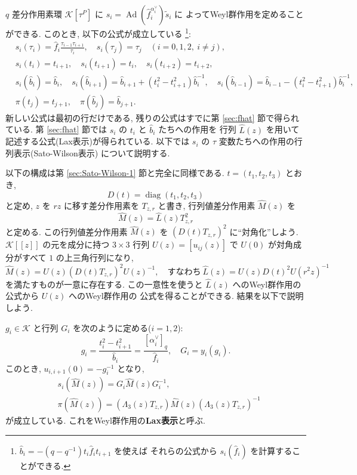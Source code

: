 \documentclass[12pt,twoside,dvipdfm]{msjproc}
\theoremstyle{definition} %
\theoremstyle{definition} %
\theoremstyle{definition} %
\numberwithin{theorem}{section}
\numberwithin{equation}{section}
\numberwithin{figure}{section}
\numberwithin{table}{section}
\newcommand\secref[1]{第 \ref{#1} 節}
\newcommand\K{\mathcal{K}}
\newcommand\diag{\mathop{\mathrm{diag}}\nolimits}
\newcommand\Ad{\mathop{\mathrm{Ad}}\nolimits}
\newcommand\ts{{\tilde{s}}}
\newcommand\hL{{\widehat{L}}}
\newcommand\hM{{\widehat{M}}}
\newcommand\hb{{\hat{b}}}
\newcommand\hf{{\hat{f}}}
\newcommand\av{\alpha^\vee}
\begin{document}
$q$ 差分作用素環 $\K[\tau^P]$ に $s_i=\Ad(\hf_i^{\av_i})\ts_i$ に
よってWeyl群作用を定めることができる. このとき, 以下の公式が成立している%
\footnote{$\hb_i=-(q-q^{-1})t_i\hf_i t_{i+1}$ を使えば
それらの公式から $s_i(\hf_i)$ を計算することができる.}:
\begin{align*}
 &
 s_i(\tau_i) = \hf_i \frac{\tau_{i-1}\tau_{i+1}}{\tau_i}, \quad
 s_i(\tau_j) = \tau_j \quad
 (i=0,1,2,\ i\ne j),
 \\ &
 s_i(t_i) = t_{i+1}, \quad
 s_i(t_{i+1}) = t_i, \quad
 s_i(t_{i+2}) = t_{i+2},
 \\ &
 s_i(\hb_i) = \hb_i, \quad
 s_i(\hb_{i+1}) = \hb_{i+1} + (t_i^2-t_{i+1}^2)\hb_i^{-1}, \quad
 s_i(\hb_{i-1}) = \hb_{i-1} - (t_i^2-t_{i+1}^2)\hb_i^{-1},
 \\ &
 \pi(t_j) = t_{j+1}, \quad
 \pi(\hb_j) = \hb_{j+1}.
\end{align*}
新しい公式は最初の行だけである, 
残りの公式はすでに\secref{sec:fhat}で得られている.
\secref{sec:fhat}では $s_i$ の $t_i$ と $\hb_i$ たちへの作用を
行列 $\hL(z)$ を用いて記述する公式(Lax表示)が得られている.
以下では $s_i$ の $\tau$ 変数たちへの作用の行列表示(Sato-Wilson表示)
について説明する.

以下の構成は\secref{sec:Sato-Wilson-1}と完全に同様である.
$t=(t_1,t_2,t_3)$ とおき,
\begin{equation*}
 D(t)=\diag(t_1,t_2,t_3)
\end{equation*}
と定め, $z$ を $rz$ に移す差分作用素を $T_{z,r}$ と書き, 
行列値差分作用素 $\hM(z)$ を
\begin{equation*}
  \hM(z) = \hL(z)T_{z,r}^2
\end{equation*}
と定める. この行列値差分作用素 $\hM(z)$ を $(D(t)T_{z,r})^2$ に``対角化''しよう.
$\K[[z]]$ の元を成分に持つ $3\times 3$ 行列 $U(z)=[u_{ij}(z)]$ 
で $U(0)$ が対角成分がすべて $1$ の上三角行列になり, 
\begin{equation*}
  \hM(z) = U(z)(D(t)T_{z,r})^2U(z)^{-1},
  \quad
  \text{すなわち}\ \hL(z)=U(z)D(t)^2U(r^2z)^{-1}
\end{equation*}
を満たすものが一意に存在する.  
この一意性を使うと $\hL(z)$ へのWeyl群作用の公式から $U(z)$ へのWeyl群作用の
公式を得ることができる. 結果を以下で説明しよう.

$g_i\in\K$ と行列 $G_i$ を次のように定める($i=1,2$):
\begin{equation*}
 g_i = \frac{t_i^2-t_{i+1}^2}{\hb_i} = \frac{[\av_i]_q}{\hf_i}, \quad
 G_i = y_i(g_i).
\end{equation*}
このとき, $u_{i,i+1}(0) =  -g_i^{-1}$ となり, 
\begin{align*}
 &
 s_i(\hM(z)) = G_i \hM(z) G_i^{-1},
 \\ &
 \pi(\hM(z)) = (\Lambda_3(z)T_{z,r})\hM(z)(\Lambda_3(z)T_{z,r})^{-1}
\end{align*}
が成立している. これをWeyl群作用の{\bf Lax表示}と呼ぶ.
\end{document}
